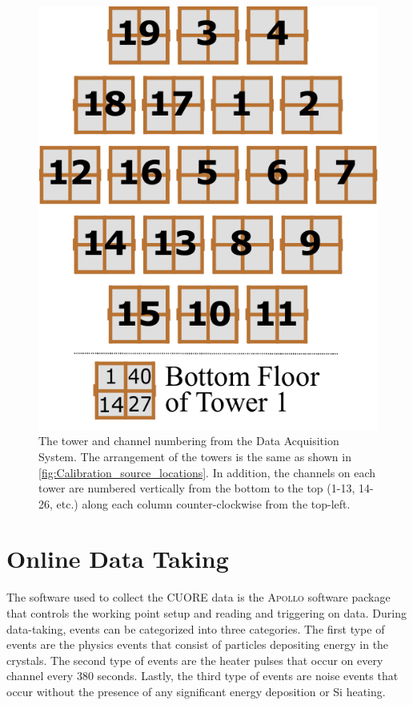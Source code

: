 \begin{figure}
    \centering
    \includegraphics[width=0.5\linewidth]{Figures/Crystals_numbering_only.pdf}
    \caption[The tower and channel numbering from the Data Acquisition System]
    {The tower and channel numbering from the Data Acquisition System.
    The arrangement of the towers is the same as shown in \autoref{fig:Calibration_source_locations}.
    In addition, the channels on each tower are numbered vertically from the bottom to the top (1-13, 14-26, etc.) along each column counter-clockwise from the top-left.}
    \label{fig:DAQ_tower_numbering}
\end{figure}

\section{Online Data Taking}
\label{sec:Online Data Taking}
The software used to collect the CUORE data is the \textsc{Apollo} software package that controls the working point setup and reading and triggering on data.
During data-taking, events can be categorized into three categories.
The first type of events are the physics events that consist of particles depositing energy in the crystals.
The second type of events are the heater pulses that occur on every channel every 380 seconds.
Lastly, the third type of events are noise events that occur without the presence of any significant energy deposition or Si heating. 
